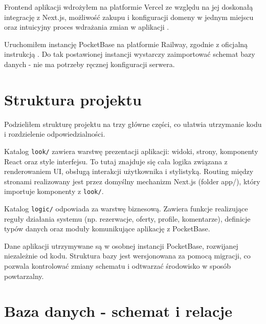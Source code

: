 \documentclass[shortabstract]{iithesis}
\begin{document}
Frontend aplikacji wdrożyłem na platformie Vercel ze względu na jej doskonałą integrację z Next.js, możliwość zakupu i konfiguracji domeny w jednym miejscu oraz intuicyjny proces wdrażania zmian w aplikacji \cite{vercel-docs,nextjs-deploy-docs}.

Uruchomiłem instancję PocketBase na platformie Railway, zgodnie z oficjalną instrukcją \cite{railway-pocketbase}. Do tak postawionej instancji wystarczy zaimportować schemat bazy danych - nie ma potrzeby ręcznej konfiguracji serwera.

\section{Struktura projektu}
Podzieliłem strukturę projektu na trzy główne części, co ułatwia utrzymanie kodu i rozdzielenie odpowiedzialności.

Katalog \texttt{look/} zawiera warstwę prezentacji aplikacji: widoki, strony, komponenty React oraz style interfejsu. To tutaj znajduje się cała logika związana z renderowaniem UI, obsługą interakcji użytkownika i stylistyką. Routing między stronami realizowany jest przez domyślny mechanizm Next.js (folder app/), który importuje komponenty z \texttt{look/}.

Katalog \texttt{logic/} odpowiada za warstwę biznesową. Zawiera funkcje realizujące reguły działania systemu (np. rezerwacje, oferty, profile, komentarze), definicje typów danych oraz moduły komunikujące aplikację z PocketBase.

Dane aplikacji utrzymywane są w osobnej instancji PocketBase, rozwijanej niezależnie od kodu. Struktura bazy jest wersjonowana za pomocą migracji, co pozwala kontrolować zmiany schematu i odtwarzać środowisko w sposób powtarzalny.

\section{Baza danych - schemat i relacje}
\end{document}
